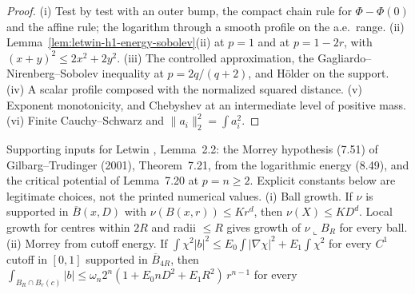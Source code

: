 \begin{proof}
  \leanok
  (i) Test by test with an outer bump, the compact chain rule for $\Phi-\Phi(0)$ and the affine rule; the logarithm through
  a smooth profile on the a.e.\ range.
  (ii) Lemma~\ref{lem:letwin-h1-energy-sobolev}(ii) at $p=1$ and at $p=1-2r$, with $(x+y)^2\le2x^2+2y^2$.
  (iii) The controlled approximation, the Gagliardo--Nirenberg--Sobolev inequality at $p=2q/(q+2)$, and H\"older on the
  support.
  (iv) A scalar profile composed with the normalized squared distance.
  (v) Exponent monotonicity, and Chebyshev at an intermediate level of positive mass.
  (vi) Finite Cauchy--Schwarz and $\|a_i\|_2^2=\int a_i^2$.
\end{proof}

\begin{lemma}
  \label{lem:letwin-morrey-potential-inputs}
  \leanok
  Supporting inputs for Letwin \cite{Letwin2026QuadraticKLS}, Lemma~2.2: the Morrey hypothesis (7.51) of
  Gilbarg--Trudinger (2001), Theorem~7.21, from the logarithmic energy (8.49), and the critical potential of Lemma~7.20 at
  $p=n\ge2$. Explicit constants below are legitimate choices, not the printed numerical values.
  (i) Ball growth. If $\nu$ is supported in $\overline B(x,D)$ with $\nu(B(x,r))\le Kr^d$, then $\nu(X)\le KD^d$. Local
  growth for centres within $2R$ and radii $\le R$ gives growth of $\nu\llcorner B_R$ for every ball.
  (ii) Morrey from cutoff energy. If $\int\chi^2|b|^2\le E_0\int|\nabla\chi|^2+E_1\int\chi^2$ for every $C^1$ cutoff in
  $[0,1]$ supported in $\overline B_{4R}$, then $\int_{B_R\cap B_r(c)}|b|\le\omega_n2^n(1+E_0nD^2+E_1R^2)\,r^{n-1}$ for every

\end{lemma}
